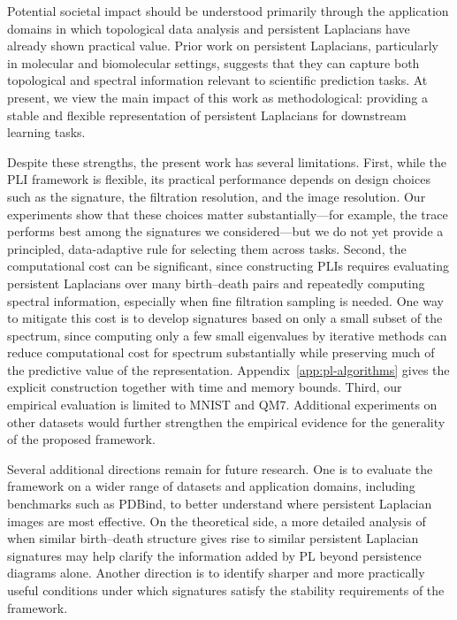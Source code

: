 \documentclass{article}
\begin{document}
Potential societal impact should be understood primarily through the application domains in which topological data analysis and persistent Laplacians have already shown practical value. Prior work on persistent Laplacians, particularly in molecular and biomolecular settings, suggests that they can capture both topological and spectral information relevant to scientific prediction tasks. At present, we view the main impact of this work as methodological: providing a stable and flexible representation of persistent Laplacians for downstream learning tasks.

Despite these strengths, the present work has several limitations. First, while the PLI framework is flexible, its practical performance depends on design choices such as the signature, the filtration resolution, and the image resolution. Our experiments show that these choices matter substantially---for example, the trace performs best among the signatures we considered---but we do not yet provide a principled, data-adaptive rule for selecting them across tasks. Second, the computational cost can be significant, since constructing PLIs requires evaluating persistent Laplacians over many birth--death pairs and repeatedly computing spectral information, especially when fine filtration sampling is needed. One way to mitigate this cost is to develop signatures based on only a small subset of the spectrum, since computing only a few small eigenvalues by iterative methods can reduce computational cost for spectrum substantially while preserving much of the predictive value of the representation. Appendix~\ref{app:pl-algorithms} gives the explicit construction together with time and memory bounds. Third, our empirical evaluation is limited to MNIST and QM7. Additional experiments on other datasets would further strengthen the empirical evidence for the generality of the proposed framework.

Several additional directions remain for future research. One is  to evaluate the framework on a wider range of datasets and application domains, including benchmarks such as PDBind, to better understand where persistent Laplacian images are most effective. On the theoretical side, a more detailed analysis of when similar birth--death structure gives rise to similar persistent Laplacian signatures may help clarify the information added by PL beyond persistence diagrams alone. Another direction is to identify sharper and more practically useful conditions under which signatures satisfy the stability requirements of the framework.
\end{document}
